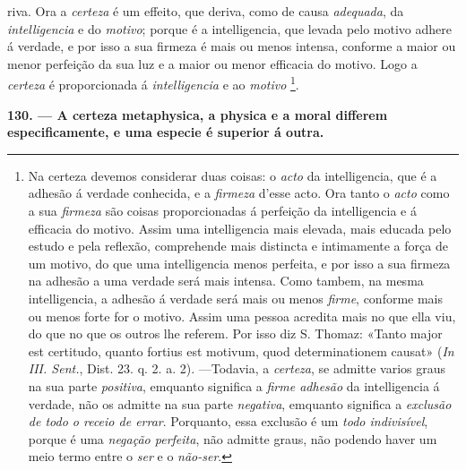  riva. Ora a \emph{certeza} é um effeito, que deriva, como de causa \emph{adequada}, da \emph{intelligencia} e do \emph{motivo}; porque é a intelligencia, que levada pelo motivo adhere á verdade, e por isso a sua firmeza é mais ou menos intensa, conforme a maior ou menor perfeição da sua luz e a maior ou menor efficacia do motivo. Logo a \emph{certeza} é proporcionada á \emph{intelligencia} e ao \emph{motivo} \footnote{Na certeza devemos considerar duas coisas: o \emph{acto} da intelligencia, que é a adhesão á verdade conhecida, e a \emph{firmeza} d'esse acto. Ora tanto o \emph{acto} como a sua \emph{firmeza} são coisas proporcionadas á perfeição da intelligencia e á efficacia do motivo. Assim uma intelligencia mais elevada, mais educada pelo estudo e pela reflexão, comprehende mais distincta e intimamente a força de um motivo, do que uma intelligencia menos perfeita, e por isso a sua firmeza na adhesão a uma verdade será mais intensa. Como tambem, na mesma intelligencia, a adhesão á verdade será mais ou menos \emph{firme}, conforme mais ou menos forte for o motivo. Assim uma pessoa acredita mais no que ella viu, do que no que os outros lhe referem. Por isso diz S. Thomaz: «Tanto major est certitudo, quanto fortius est motivum, quod determinationem causat» (\emph{In III. Sent.}, Dist. 23. q. 2. a. 2). ---Todavia, a \emph{certeza}, se admitte varios graus na sua parte \emph{positiva}, emquanto significa a \emph{firme adhesão} da intelligencia á verdade, não os admitte na sua parte \emph{negativa}, emquanto significa a \emph{exclusão de todo o receio de errar}. Porquanto, essa exclusão é um \emph{todo indivisível}, porque é uma \emph{negação perfeita}, não admitte graus, não podendo haver um meio termo entre o \emph{ser} e o \emph{não-ser}.}.

\textbf{130. --- A certeza metaphysica, a physica e a moral differem especificamente, e uma especie é superior á outra.}


